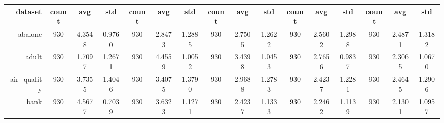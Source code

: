 \begin{table}[htbp]
{\begin{tabular}{rccccccccccccccc}
			\cmidrule{2-16}    \textbf{dataset} & \textbf{count}                           & \textbf{avg}                                                              & \textbf{std}    & \textbf{count}                 & \textbf{avg}    & \textbf{std}    & \textbf{count}                  & \textbf{avg}    & \textbf{std}    & \textbf{count}                  & \textbf{avg}                                                              & \textbf{std}    & \textbf{count}                  & \textbf{avg}                                                                       & \textbf{std}    \\
			\midrule
			abalone                             & 930                                      & 4.3548                                                                    & 0.9760          & 930                            & 2.8473          & 1.2885          & 930                             & 2.7505          & 1.2622          & 930                             & 2.5602                                                                    & 1.2988          & 930                             & \cellcolor[rgb]{ .776,  .937,  .808}\textcolor[rgb]{ 0,  .38,  0}{2.4871}          & 1.3182          \\
			adult                               & 930                                      & \cellcolor[rgb]{ .776,  .937,  .808}\textcolor[rgb]{ 0,  .38,  0}{1.7097} & 1.2671          & 930                            & 4.4559          & 1.0052          & 930                             & 3.4398          & 1.0453          & 930                             & 2.7656                                                                    & 0.9837          & 930                             & 2.3065                                                                             & 1.0670          \\
			air\_quality                        & 930                                      & 3.7355                                                                    & 1.4046          & 930                            & 3.4075          & 1.3790          & 930                             & 2.9688          & 1.2783          & 930                             & \cellcolor[rgb]{ .776,  .937,  .808}\textcolor[rgb]{ 0,  .38,  0}{2.4237} & 1.2281          & 930                             & 2.4645                                                                             & 1.2906          \\
			bank                                & 930                                      & 4.5677                                                                    & 0.7039          & 930                            & 3.6323          & 1.1271          & 930                             & 2.4237          & 1.1333          & 930                             & 2.2462                                                                    & 1.1139          & 930                             & \cellcolor[rgb]{ .776,  .937,  .808}\textcolor[rgb]{ 0,  .38,  0}{2.1301}          & 1.0957          \\

\end{tabular}}
\end{table}
